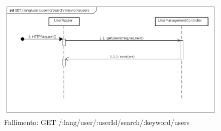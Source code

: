 \begin{itemize}
\begin{figure}[ht]
	\centering
	\includegraphics[scale=0.45]{UML/DiagrammiDiSequenza/Back-end/GET__lang_user__userId_search__keyword_users_failure.png}
	\caption{Fallimento: GET /:lang/user/:userId/search/:keyword/users}
\end{figure}
\FloatBarrier

\end{itemize}






